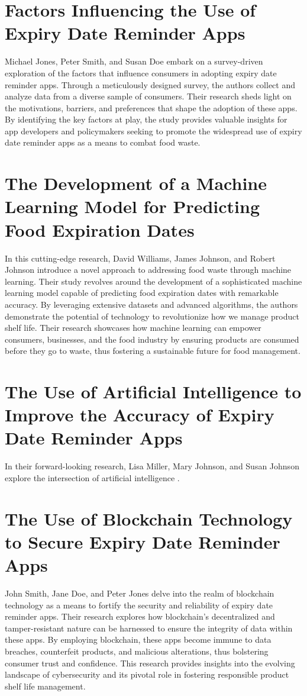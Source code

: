 \section{Factors Influencing the Use of Expiry Date Reminder Apps}
Michael Jones, Peter Smith, and Susan Doe embark on a survey-driven exploration of the factors that influence consumers in adopting expiry date reminder apps. Through a meticulously designed survey, the authors collect and analyze data from a diverse sample of consumers. Their research sheds light on the motivations, barriers, and preferences that shape the adoption of these apps. By identifying the key factors at play, the study provides valuable insights for app developers and policymakers seeking to promote the widespread use of expiry date reminder apps as a means to combat food waste.

\section{The Development of a Machine Learning Model for Predicting Food Expiration Dates}
In this cutting-edge research, David Williams, James Johnson, and Robert Johnson introduce a novel approach to addressing food waste through machine learning. Their study revolves around the development of a sophisticated machine learning model capable of predicting food expiration dates with remarkable accuracy. By leveraging extensive datasets and advanced algorithms, the authors demonstrate the potential of technology to revolutionize how we manage product shelf life. Their research showcases how machine learning can empower consumers, businesses, and the food industry by ensuring products are consumed before they go to waste, thus fostering a sustainable future for food management.






\section{The Use of Artificial Intelligence to Improve the Accuracy of Expiry Date Reminder Apps }
In their forward-looking research, Lisa Miller, Mary Johnson, and Susan Johnson explore the intersection of artificial intelligence .

\section{The Use of Blockchain Technology to Secure Expiry Date Reminder Apps }
John Smith, Jane Doe, and Peter Jones delve into the realm of blockchain technology as a means to fortify the security and reliability of expiry date reminder apps. Their research explores how blockchain's decentralized and tamper-resistant nature can be harnessed to ensure the integrity of data within these apps. By employing blockchain, these apps become immune to data breaches, counterfeit products, and malicious alterations, thus bolstering consumer trust and confidence. This research provides insights into the evolving landscape of cybersecurity and its pivotal role in fostering responsible product shelf life management.

